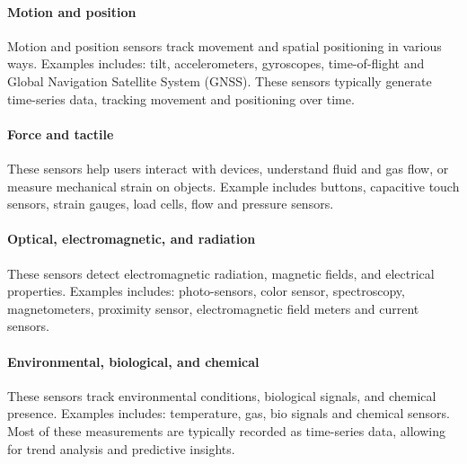 \paragraph*{Motion and position}
Motion and position sensors track movement and spatial positioning in various ways. 
Examples includes: tilt, accelerometers, gyroscopes, time-of-flight and Global Navigation Satellite System (GNSS). 
These sensors typically generate time-series data, tracking movement and positioning over time.

\paragraph*{Force and tactile}
These sensors help users interact with devices, understand fluid and gas flow, or measure mechanical strain on objects. 
Example includes buttons, capacitive touch sensors, strain gauges, load cells, flow and pressure sensors. 

\paragraph*{Optical, electromagnetic, and radiation}
These sensors detect electromagnetic radiation, magnetic fields, and electrical properties. 
Examples includes: photo-sensors, color sensor, spectroscopy, magnetometers, proximity sensor, electromagnetic field meters and current sensors. 

\paragraph*{Environmental, biological, and chemical}
These sensors track environmental conditions, biological signals, and chemical presence. 
Examples includes: temperature, gas, bio signals and chemical sensors. 
Most of these measurements are typically recorded as time-series data, allowing for trend analysis and predictive insights.
